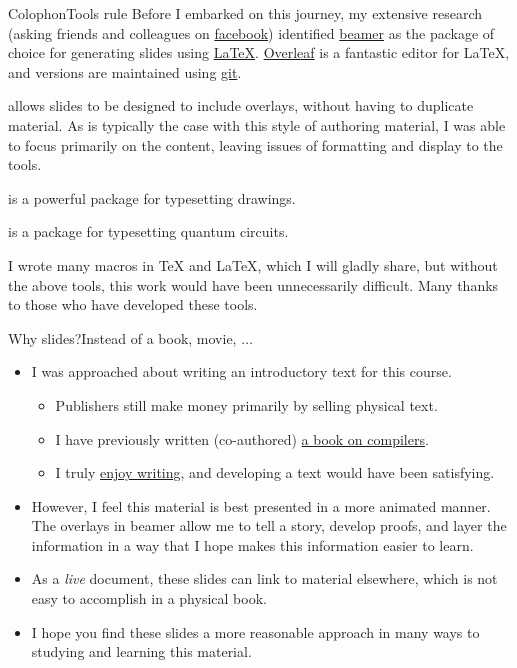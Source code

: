 \begin{frame}{Colophon}{Tools rule}
Before I embarked on this journey, my extensive research (asking friends and colleagues on \href{https://en.wikipedia.org/wiki/Facebook}{facebook}) identified \href{https://en.wikipedia.org/wiki/Beamer_(LaTeX)}{beamer} as the package of choice for generating slides using \href{https://en.wikibooks.org/wiki/LaTeX}{\LaTeX}.  \href{https://en.wikipedia.org/wiki/Overleaf}{Overleaf} is a fantastic editor for \LaTeX, and versions are maintained using \href{https://en.wikipedia.org/wiki/Git}{git}.

\begin{description}[<+->]
  \item[beamer] allows slides to be designed to include overlays, without having to duplicate material. As is typically the case with this style of authoring material, I was able to focus primarily on the content, leaving issues of formatting and display to the tools.
  \item[\href{https://en.wikibooks.org/wiki/LaTeX/PGF/TikZ}{tikz}] is a powerful package for typesetting drawings.
  \item[\href{https://ctan.org/pkg/quantikz?lang=en}{quantikz}] is a package for typesetting quantum circuits.
\end{description}
I wrote many macros in \TeX{} and \LaTeX{}, which I will gladly share, but without the above tools, this work would have been unnecessarily difficult.  Many thanks to those who have developed these tools.
\end{frame}

\begin{frame}{Why slides?}{Instead of a book, movie, $\ldots$}
\begin{itemize}
    \item I was approached about writing an introductory text for this course.
    \begin{itemize}
    \item Publishers still make money primarily by selling physical text.
    \item I have previously written (co-authored) \href{https://www.amazon.com/Crafting-Compiler-Charles-N-Fischer/dp/0136067050}{a book on compilers}.
    \item I truly \href{https://www.cse.wustl.edu/~cytron/FAQ/writers.html}{enjoy writing}, and developing a text would have been satisfying.
    \end{itemize}
    \item However, I feel this material is best presented in a more animated manner.  The overlays in beamer allow me to tell a story, develop proofs, and layer the information in a way that I hope makes this information easier to learn.
    \item As a \emph{live} document, these slides can link to material elsewhere, which is not easy to accomplish in a physical book.
    \item I hope you find these slides a more reasonable approach in many ways to studying and learning this material.
\end{itemize}
\end{frame}

